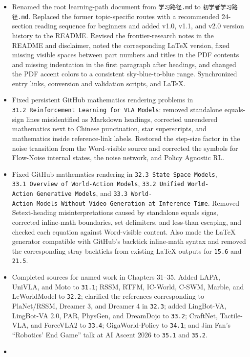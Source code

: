 \begin{itemize}
\item
  Renamed the root learning-path document from \texttt{学习路径.md} to \texttt{初学者学习路径.md}. Replaced the former topic-specific routes with a recommended 24-section reading sequence for beginners and added v1.0, v1.1, and v2.0 version history to the README. Revised the frontier-research notes in the README and disclaimer, noted the corresponding LaTeX version, fixed missing visible spaces between part numbers and titles in the PDF contents and missing indentation in the first paragraph after headings, and changed the PDF accent colors to a consistent sky-blue-to-blue range. Synchronized entry links, conversion and validation scripts, and LaTeX.
\item
  Fixed persistent GitHub mathematics rendering problems in \texttt{31.2\ Reinforcement\ Learning\ for\ VLA\ Models}: removed standalone equals-sign lines misidentified as Markdown headings, corrected unrendered mathematics next to Chinese punctuation, star superscripts, and mathematics inside reference-link labels. Restored the step-size factor in the noise transition from the Word-visible source and corrected the symbols for Flow-Noise internal states, the noise network, and Policy Agnostic RL.
\item
  Fixed GitHub mathematics rendering in \texttt{32.3\ State\ Space\ Models}, \texttt{33.1\ Overview\ of\ World-Action\ Models}, \texttt{33.2\ Unified\ World-Action\ Generative\ Models}, and \texttt{33.3\ World-Action\ Models\ Without\ Video\ Generation\ at\ Inference\ Time}. Removed Setext-heading misinterpretations caused by standalone equals signs, corrected inline-math boundaries, set delimiters, and less-than escaping, and checked each equation against Word-visible content. Also made the LaTeX generator compatible with GitHub's backtick inline-math syntax and removed the corresponding stray backticks from existing LaTeX outputs for \texttt{15.6} and \texttt{21.5}.
\item
  Completed sources for named work in Chapters 31--35. Added LAPA, UniVLA, and Moto to \texttt{31.1}; RSSM, RTFM, IC-World, C-SWM, Marble, and LeWorldModel to \texttt{32.2}; clarified the references corresponding to PlaNet/RSSM, Dreamer 3, and Dreamer 4 in \texttt{32.3}; added LingBot-VA, LingBot-VA 2.0, PAR, PhysGen, and DreamDojo to \texttt{33.2}; CraftNet, Tactile-VLA, and ForceVLA2 to \texttt{33.4}; GigaWorld-Policy to \texttt{34.1}; and Jim Fan's ``Robotics' End Game'' talk at AI Ascent 2026 to \texttt{35.1} and \texttt{35.2}.
\item

\end{itemize}
